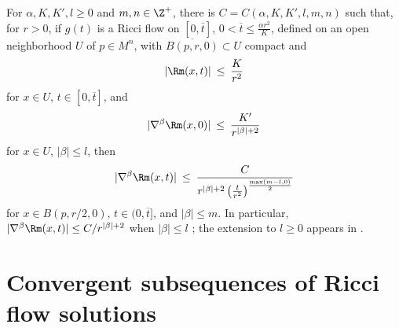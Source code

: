 \begin{theorem}
  \label{thm:kl-local-derivative-estimates-existence-local-derivative-estimates}
 \label{localder}

For $\alpha,K,K',l\geq0$ and $m,n\in\Z^+$, there is
$C=C(\alpha,K,K',l,m,n)$ such that, for $r>0$, if $g(t)$ is a Ricci flow
on $[0,\overline t]$, $0<\overline t\leq\frac{\alpha r^2}{K}$, defined on
an open neighborhood $U$ of $p\in M^n$, with
$\overline{B(p,r,0)}\subset U$ compact and
\begin{equation}
|\Rm(x,t)|\: \le \:\frac K{r^2}
\end{equation}
for $x\in U$, $t\in[0,\overline t]$, and
\begin{equation}
|\nabla^\beta\Rm(x,0)|\: \le \:\frac{K'}{r^{|\beta|+2}}
\end{equation}
for $x\in U$, $|\beta|\leq l$, then
\begin{equation}
|\nabla^\beta\Rm(x,t)|\: \le \:
\frac{C}{r^{|\beta|+2}\left(\frac{t}{r^2}\right)^{\frac{\max(m-l,0)}2}}
\end{equation}
for $x\in B(p,r/2,0)$, $t\in(0,\overline t]$, and $|\beta|\leq m$.
In particular, $|\nabla^\beta\Rm(x,t)|\leq C/r^{|\beta|+2}$ when
$|\beta|\leq l$ \cite{Shi2}; the extension to $l\geq0$ appears in
\cite[Appendix B]{Lu-Tian}.
\end{theorem}

\section{Convergent subsequences of Ricci flow solutions}
\label{subsequence}

